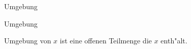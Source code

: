 \documentclass[class=article, crop=false]{standalone}
\begin{document}
\begin{zettel}{Umgebung}
\begin{flashcard}[3qvky5mu]{Umgebung}
	\begin{definition}[Umgebung]
		Umgebung von $x$ ist eine offenen Teilmenge die $x$ enth"alt.
	\end{definition}
\end{flashcard}
\end{zettel}
\end{document}
